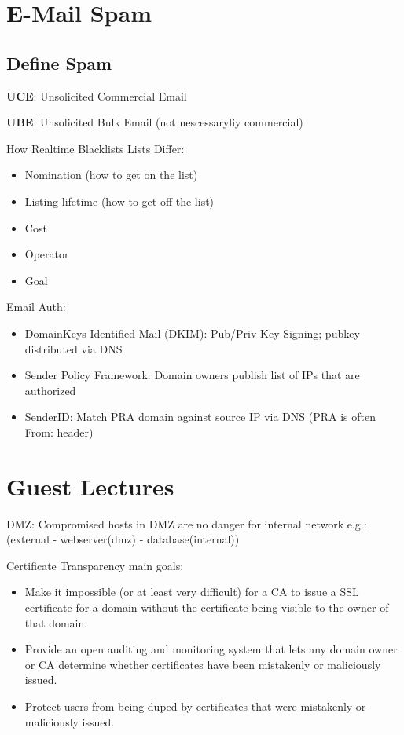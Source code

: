 \documentclass[fs, footer]{latex4ei}
\begin{document}
\begin{multicols*}{4}
\section{E-Mail Spam}
\subsection{Define Spam}
\textbf{UCE}: Unsolicited Commercial Email

\textbf{UBE}: Unsolicited Bulk Email (not nescessaryliy commercial)

How Realtime Blacklists Lists Differ:
\begin{itemize}
	\item Nomination (how to get on the list)
	\item Listing lifetime (how to get off the list)
	\item Cost
	\item Operator
	\item Goal
\end{itemize}

Email Auth:
\begin{itemize}
	\item DomainKeys Identified Mail (DKIM): Pub/Priv Key Signing; pubkey distributed via DNS
	\item Sender Policy Framework: Domain owners publish list of IPs that are authorized
	\item SenderID: Match PRA domain against source IP via DNS (PRA is often From: header)
	\end{itemize}
	
\section{Guest Lectures}
DMZ: Compromised hosts in DMZ are no danger for internal network e.g.:(external - webserver(dmz) - database(internal))

Certificate Transparency  main goals:
\begin{itemize}
	\item Make it impossible (or at least very difficult) for a CA to issue a SSL certificate for a domain without the certificate being visible to the owner of that domain.
	\item Provide an open auditing and monitoring system that lets any domain owner or CA determine whether certificates have been mistakenly or maliciously issued.
	\item Protect users from being duped by certificates that were mistakenly or maliciously issued.
\end{itemize}

\end{multicols*}

\end{document}
